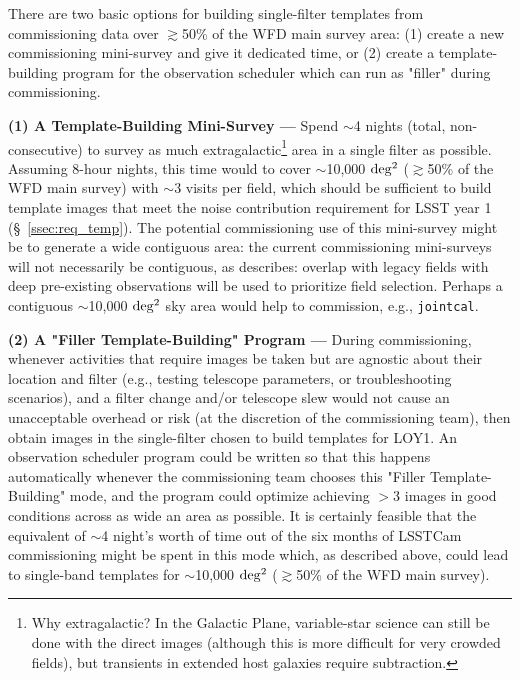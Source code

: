 \documentclass[DM,lsstdraft,toc]{lsstdoc}
\begin{document}
There are two basic options for building single-filter templates from commissioning data over $\gtrsim$50\% of the WFD main survey area: (1) create a new commissioning mini-survey and give it dedicated time, or (2) create a template-building program for the observation scheduler which can run as "filler" during commissioning.

{\bf (1) A Template-Building Mini-Survey ---} Spend $\sim$4 nights (total, non-consecutive) to survey as much extragalactic\footnote{Why extragalactic? In the Galactic Plane, variable-star science can still be done with the direct images (although this is more difficult for very crowded fields), but transients in extended host galaxies require subtraction.} area in a single filter as possible. Assuming 8-hour nights, this time would to cover $\sim$10,000 $\rm deg^2$ ($\gtrsim$50\% of the WFD main survey) with $\sim$3 visits per field, which should be sufficient to build template images that meet the noise contribution requirement for LSST year 1 (\S~\ref{ssec:req_temp}). The potential commissioning use of this mini-survey might be to generate a wide contiguous area: the current commissioning mini-surveys will not necessarily be contiguous, as  describes: overlap with legacy fields with deep pre-existing observations will be used to prioritize field selection. Perhaps a contiguous $\sim$10,000 $\rm deg^2$ sky area would help to commission, e.g., {\tt jointcal}.

{\bf (2) A "Filler Template-Building" Program ---} During commissioning, whenever activities that require images be taken but are agnostic about their location and filter (e.g., testing telescope parameters, or troubleshooting scenarios), and a filter change and/or telescope slew would not cause an unacceptable overhead or risk (at the discretion of the commissioning team), then obtain images in the single-filter chosen to build templates for LOY1. An observation scheduler program could be written so that this happens automatically whenever the commissioning team chooses this "Filler Template-Building" mode, and the program could optimize achieving $>$3 images in good conditions across as wide an area as possible. It is certainly feasible that the equivalent of $\sim$4 night's worth of time out of the six months of LSSTCam commissioning might be spent in this mode which, as described above, could lead to single-band templates for $\sim$10,000 $\rm deg^2$ ($\gtrsim$50\% of the WFD main survey).
\end{document}
